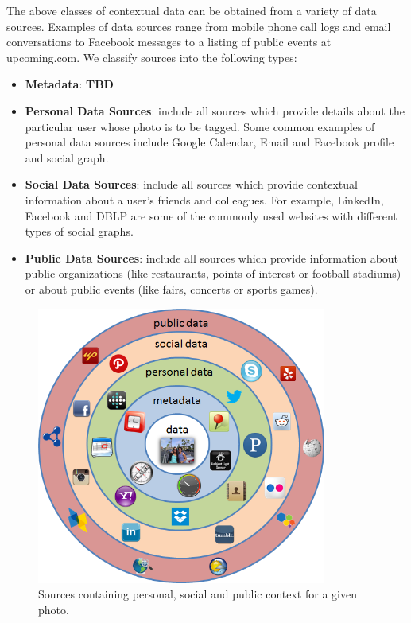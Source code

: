 The above classes of contextual data can be obtained from a variety of data sources. Examples of data sources range from mobile phone call logs and email conversations to Facebook messages to a listing of public events at upcoming.com. We classify sources into the following types:

\begin{itemize}
\item \textbf{Metadata}: \textbf{TBD}
\item \textbf{Personal Data Sources}: include all sources which provide details about the particular user whose photo is to be tagged. Some common examples of personal data sources include Google Calendar, Email and Facebook profile and social graph.
\item \textbf{Social Data Sources}: include all sources which provide contextual information about a user's friends and colleagues. For example, LinkedIn, Facebook and DBLP are some of the commonly used websites with different types of social graphs.
\item \textbf{Public Data Sources}: include all sources which provide information about public organizations (like restaurants, points of interest or football stadiums) or about public events (like fairs, concerts or sports games).
\end{itemize}

\begin{figure}[h]
\centering
\includegraphics[width=0.85\textwidth]{media/chapter2/personal-social-public-data-sources.png}
\caption{Sources containing personal, social and public context for a given photo.}
\label{fig:personal-social-public-sources}
\end{figure}


